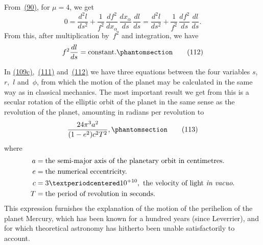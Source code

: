 \documentclass[12pt]{book}[2005/09/16]
\newcommand{\Change}[2]{#2}
\newcommand{\Add}[1]{\Change{}{#1}}
\newcommand{\PageSep}[1]{\ignorespaces}
\newcommand{\Tag}[1]{%
  \phantomsection
  \label{eqn:#1}
  \tag*{#1}
}
\newcommand{\Eqref}[1]{\hyperref[eqn:#1]{#1}}
\begin{document}
From~\Eqref{(90)}, for $\mu = 4$, we get
\[
0 = \frac{d^{2} l}{ds^{2}}
  + \frac{1}{f^{2}}\, \frac{df^{2}}{dx_{\alpha}}\, \frac{dx_{\alpha}}{ds}
    \Change{}{\, \frac{dl}{ds}}
  = \frac{d^{2} l}{ds^{2}} + \frac{1}{f^{2}}\, \frac{df^{2}}{ds}
    \Change{}{\, \frac{dl}{ds}}.
\]
From this, after multiplication by~$f^{2}$ and integration, we
have
\[
f^{2} \frac{dl}{ds} = \text{constant}.
\Tag{(112)}
\]

In \Eqref{(\Change{109b}{109c})},~\Eqref{(111)} and~\Eqref{(112)} we have three equations
between the four variables $s$,~$r$,~$l$ and~$\phi$, from which the
motion of the planet may be calculated in the same way
as in classical mechanics. The most important result we
get from this is a secular rotation of the elliptic orbit of
the planet in the same sense as the revolution of the
planet, amounting in radians per revolution to
\[
\frac{24 \pi^{3} a^{2}}{(1 - e^{2}) c^{2} T^{2}}\Add{,}
\Tag{(113)}
\]
\PageSep{107}
where
\begin{align*}
a &= \text{the semi-major axis of the planetary orbit in
centimetres.} \\
e &= \text{the numerical eccentricity.} \\
c &= 3·10^{+10}, \text{ the velocity of light \textit{in vacuo}.} \\
T &= \text{the period of revolution in seconds.}
\end{align*}
This expression furnishes the explanation of the motion
of the perihelion of the planet Mercury, which has been
%
%
known for a hundred years (since Leverrier), and for
which theoretical astronomy has hitherto been unable
satisfactorily to account.
\end{document}
